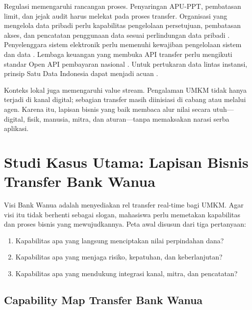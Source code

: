 Regulasi memengaruhi rancangan proses. Penyaringan APU-PPT, pembatasan limit,
dan jejak audit harus melekat pada proses transfer. Organisasi yang mengelola
data pribadi perlu kapabilitas pengelolaan persetujuan, pembatasan akses, dan
pencatatan penggunaan data sesuai perlindungan data pribadi \cite{uupdp2022}.
Penyelenggara sistem elektronik perlu memenuhi kewajiban pengelolaan sistem dan
data \cite{pp712019}. Lembaga keuangan yang membuka API transfer perlu mengikuti
standar Open API pembayaran nasional \cite{snapbi}. Untuk pertukaran data lintas
instansi, prinsip Satu Data Indonesia dapat menjadi acuan \cite{satudata}.

Konteks lokal juga memengaruhi value stream. Pengalaman UMKM tidak hanya terjadi
di kanal digital; sebagian transfer masih diinisiasi di cabang atau melalui
agen. Karena itu, lapisan bisnis yang baik membaca alur nilai secara
utuh---digital, fisik, manusia, mitra, dan aturan---tanpa memaksakan narasi
serba aplikasi.

\section{Studi Kasus Utama: Lapisan Bisnis Transfer Bank Wanua}

Visi Bank Wanua adalah menyediakan rel transfer real-time bagi UMKM. Agar visi
itu tidak berhenti sebagai slogan, mahasiswa perlu memetakan kapabilitas dan
proses bisnis yang mewujudkannya. Peta awal disusun dari tiga pertanyaan:

\begin{enumerate}
  \item Kapabilitas apa yang langsung menciptakan nilai perpindahan dana?
  \item Kapabilitas apa yang menjaga risiko, kepatuhan, dan keberlanjutan?
  \item Kapabilitas apa yang mendukung integrasi kanal, mitra, dan pencatatan?
\end{enumerate}

\subsection{Capability Map Transfer Bank Wanua}


